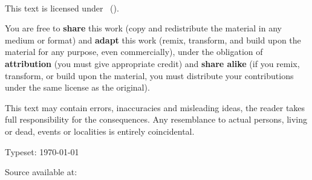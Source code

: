 
{\small
\setlength{\parindent}{0em}\setlength{\parskip}{1em}

~

\vfill


\doclicenseIcon
This text is licensed under 
\doclicenseLongNameRef \ 
(\doclicenseNameRef).

You are free to 
\textbf{share} this work (copy and redistribute the material in any medium or format) 
and 
\textbf{adapt} this work (remix, transform, and build upon the material for any purpose, even commercially),
under the obligation of 
\textbf{attribution} (you must give appropriate credit)
and
\textbf{share alike} (if you remix, transform, or build upon the material, you must distribute your contributions under the same license as the original). 

This text may contain errors, inaccuracies and misleading ideas, the reader takes full responsibility for the consequences. 
Any resemblance to actual persons, living or dead, events or localities is entirely coincidental.

Typeset: \today

Source available at: \publisher{}
}
